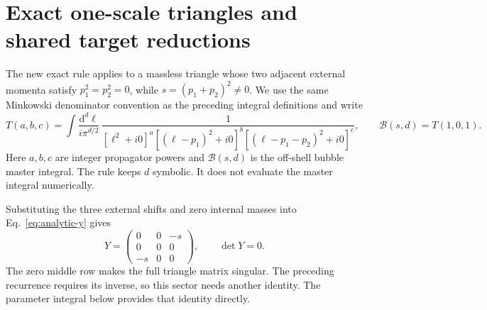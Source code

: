 \section{Exact one-scale triangles and shared target reductions}
\label{app:analytic-batch}

The new exact rule applies to a massless triangle whose two adjacent external momenta satisfy
\(p_1^2=p_2^2=0\), while \(s=(p_1+p_2)^2\ne0\). We use the same Minkowski denominator convention as the preceding integral definitions and write
\begin{equation}
 T(a,b,c)=\int\frac{\mathrm d^d\ell}{i\pi^{d/2}}\,
 \frac{1}{[\ell^2+i0]^a[(\ell-p_1)^2+i0]^b
 [(\ell-p_1-p_2)^2+i0]^c},
 \qquad \mathcal B(s,d)=T(1,0,1).
 \label{eq:batch-triangle-definition}
\end{equation}
Here \(a,b,c\) are integer propagator powers and \(\mathcal B(s,d)\) is the off-shell bubble master integral. The rule keeps \(d\) symbolic. It does not evaluate the master integral numerically.

Substituting the three external shifts and zero internal masses into Eq.~\eqref{eq:analytic-y} gives
\begin{equation}
 Y=\begin{pmatrix}0&0&-s\\0&0&0\\-s&0&0\end{pmatrix},
 \qquad \det Y=0.
 \label{eq:batch-triangle-matrix}
\end{equation}
The zero middle row makes the full triangle matrix singular. The preceding recurrence requires its inverse, so this sector needs another identity. The parameter integral below provides that identity directly.

